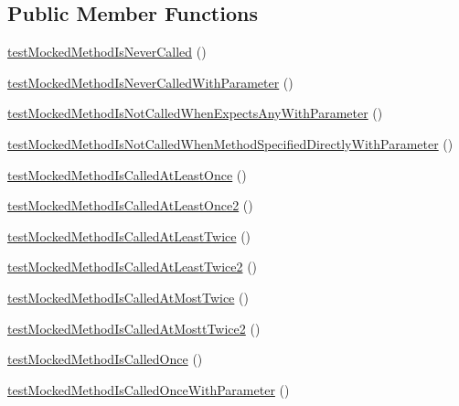 \subsection*{Public Member Functions}
\begin{DoxyCompactItemize}
\item 
\mbox{\hyperlink{class_framework___mock_object_test_a10b4ddcc836b5b19bea1ffc78ce3888d}{test\+Mocked\+Method\+Is\+Never\+Called}} ()
\item 
\mbox{\hyperlink{class_framework___mock_object_test_a07e4765125cde1e383fb126d7b43af8f}{test\+Mocked\+Method\+Is\+Never\+Called\+With\+Parameter}} ()
\item 
\mbox{\hyperlink{class_framework___mock_object_test_a3345228799983ad54f4cfc98889998fe}{test\+Mocked\+Method\+Is\+Not\+Called\+When\+Expects\+Any\+With\+Parameter}} ()
\item 
\mbox{\hyperlink{class_framework___mock_object_test_a0ff0bc1756a0363b2ddbafffbe5ba7c3}{test\+Mocked\+Method\+Is\+Not\+Called\+When\+Method\+Specified\+Directly\+With\+Parameter}} ()
\item 
\mbox{\hyperlink{class_framework___mock_object_test_aa832a75288bff3e10df6bf570820ce7d}{test\+Mocked\+Method\+Is\+Called\+At\+Least\+Once}} ()
\item 
\mbox{\hyperlink{class_framework___mock_object_test_a01e3530193eaf946fb3c7d47e599d106}{test\+Mocked\+Method\+Is\+Called\+At\+Least\+Once2}} ()
\item 
\mbox{\hyperlink{class_framework___mock_object_test_a121794e4706f2e134247f50e32968a4e}{test\+Mocked\+Method\+Is\+Called\+At\+Least\+Twice}} ()
\item 
\mbox{\hyperlink{class_framework___mock_object_test_ab1026c1dd98cc42de8f8f847ba5b4fe6}{test\+Mocked\+Method\+Is\+Called\+At\+Least\+Twice2}} ()
\item 
\mbox{\hyperlink{class_framework___mock_object_test_a8e5eecd92c001b70244d81431318dac2}{test\+Mocked\+Method\+Is\+Called\+At\+Most\+Twice}} ()
\item 
\mbox{\hyperlink{class_framework___mock_object_test_aafd9cd1ee4aa21b889640e08395881d3}{test\+Mocked\+Method\+Is\+Called\+At\+Mostt\+Twice2}} ()
\item 
\mbox{\hyperlink{class_framework___mock_object_test_a8a3f00dd547fa3d10f92700edaf6dedc}{test\+Mocked\+Method\+Is\+Called\+Once}} ()
\item 
\mbox{\hyperlink{class_framework___mock_object_test_a14445bd71d4fde72e7b291e32612f976}{test\+Mocked\+Method\+Is\+Called\+Once\+With\+Parameter}} ()
\item 

\end{DoxyCompactItemize}
